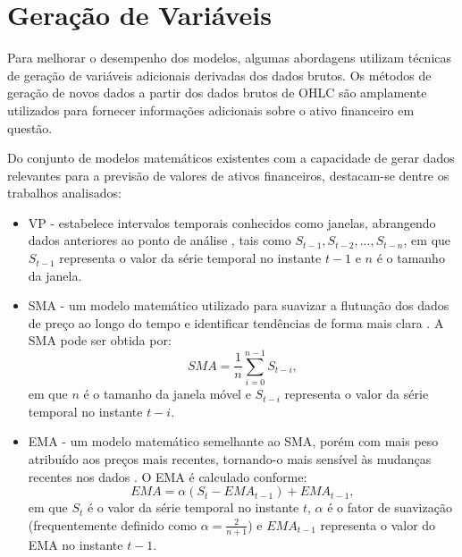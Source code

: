 \section{Geração de Variáveis}
\label{subsec:geracao_novas_variaveis}
Para melhorar o desempenho dos modelos, algumas abordagens utilizam técnicas de geração de variáveis adicionais derivadas dos dados brutos. Os métodos de geração de novos dados a partir dos dados brutos de \ac{OHLC} são amplamente utilizados para fornecer informações adicionais sobre o ativo financeiro em questão.

Do conjunto de modelos matemáticos existentes com a capacidade de gerar dados relevantes para a previsão de valores de ativos financeiros, destacam-se dentre os trabalhos analisados:

\begin{itemize}
    \item \ac{VP} - estabelece intervalos temporais conhecidos como janelas, abrangendo dados anteriores ao ponto de análise \cite{vinicius_sistemas, gabriel2023neo}, tais como $S_{t-1}, S_{t-2}, ..., S_{t-n}$, em que $S_{t-1}$ representa o valor da série temporal no instante $t-1$ e $n$ é o tamanho da janela.
    
    \item \ac{SMA} - um modelo matemático utilizado para suavizar a flutuação dos dados de preço ao longo do tempo e identificar tendências de forma mais clara \cite{vinicius_sistemas, Ciniro_Econometric}. A \ac{SMA} pode ser obtida por:
    \begin{equation}
    \label{eq:SMA}
        SMA = \frac{1}{n} \sum_{i=0}^{n-1} S_{t-i},
    \end{equation}
    em que $n$ é o tamanho da janela móvel e $S_{t-i}$ representa o valor da série temporal no instante $t-i$.
    
    \item \ac{EMA} - um modelo matemático semelhante ao \ac{SMA}, porém com mais peso atribuído aos preços mais recentes, tornando-o mais sensível às mudanças recentes nos dados \cite{Charlene}. O \ac{EMA} é calculado conforme:
    \begin{equation}
        \label{eq:EMA}
        EMA = \alpha (S_t - EMA_{t-1}) + EMA_{t-1},
    \end{equation}
    em que $S_t$ é o valor da série temporal no instante $t$, $\alpha$ é o fator de suavização (frequentemente definido como $\alpha = \frac{2}{n+1}$) e $EMA_{t-1}$ representa o valor do \ac{EMA} no instante $t-1$.
    

\end{itemize}
